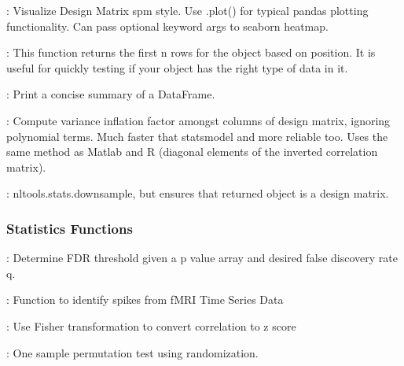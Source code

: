 \documentclass[letterpaper,10pt,english]{sphinxmanual}
\begin{document}
: Visualize Design Matrix spm style. Use .plot() for typical pandas plotting functionality. Can pass optional keyword args to seaborn heatmap.

: This function returns the first n rows for the object based on position. It is useful for quickly testing if your object has the right type of data in it.

: Print a concise summary of a DataFrame.

: Compute variance inflation factor amongst columns of design matrix, ignoring polynomial terms. Much faster that statsmodel and more reliable too. Uses the same method as Matlab and R (diagonal elements of the inverted correlation matrix).

: nltools.stats.downsample, but ensures that returned object is a design matrix.


\subsubsection{Statistics Functions}
\label{\detokenize{content/Glossary:statistics-functions}}
: Determine FDR threshold given a p value array and desired false discovery rate q.

: Function to identify spikes from fMRI Time Series Data

: Use Fisher transformation to convert correlation to z score

: One sample permutation test using randomization.
\end{document}
